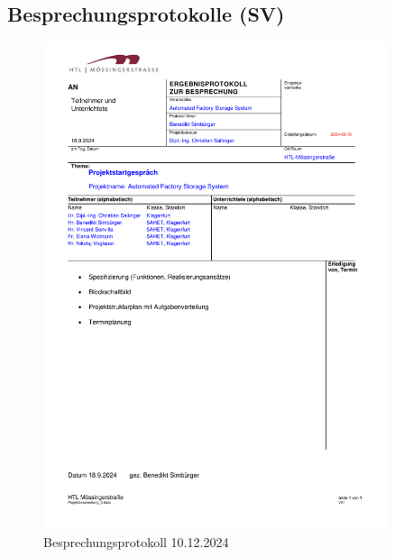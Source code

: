 \subsection{Besprechungsprotokolle (SV)}
\begin{figure}[H]
    \includegraphics[width=0.9\textwidth]{../Protokolls/Projektbesprechung_0.pdf}
    \centering
    \caption{Besprechungsprotokoll 10.12.2024}
\end{figure}

